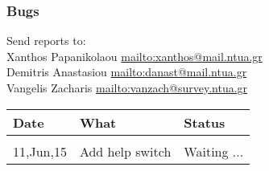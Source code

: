 \subsubsection{Bugs}
Send reports to:\\
Xanthos Papanikolaou \href{mailto:xanthos@mail.ntua.gr}{mailto:xanthos@mail.ntua.gr}\\
Demitris Anastasiou  \href{mailto:danast@mail.ntua.gr}{mailto:danast@mail.ntua.gr}\\
Vangelis Zacharis  \href{mailto:vanzach@survey.ntua.gr}{mailto:vanzach@survey.ntua.gr}\\
\bigskip

\begin{tabular}{l l l}
Date & What & Status\\
\hline \\
11,Jun,15  & Add help switch & Waiting ...\\
\end{tabular}